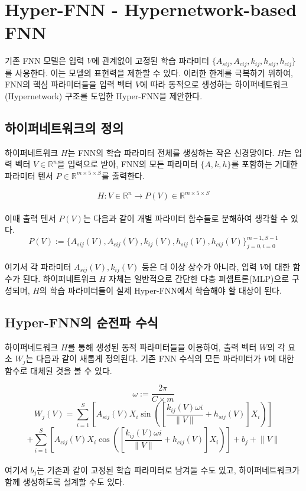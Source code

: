 \documentclass{book}
\begin{document}
\chapter{Hyper-FNN - Hypernetwork-based FNN}

기존 FNN 모델은 입력 $V$에 관계없이 고정된 학습 파라미터 $\{A_{sij}, A_{cij}, k_{ij}, h_{sij}, h_{cij}\}$를 사용한다. 이는 모델의 표현력을 제한할 수 있다. 이러한 한계를 극복하기 위하여, FNN의 핵심 파라미터들을 입력 벡터 $V$에 따라 동적으로 생성하는 하이퍼네트워크(Hypernetwork) 구조를 도입한 Hyper-FNN을 제안한다.

\section{하이퍼네트워크의 정의}

하이퍼네트워크 $H$는 FNN의 학습 파라미터 전체를 생성하는 작은 신경망이다. $H$는 입력 벡터 $V \in \mathbb{R}^n$을 입력으로 받아, FNN의 모든 파라미터 $\{A, k, h\}$를 포함하는 거대한 파라미터 텐서 $P \in \mathbb{R}^{m \times 5 \times S}$를 출력한다.

\[
H: V \in \mathbb{R}^n \rightarrow P(V) \in \mathbb{R}^{m \times 5 \times S}
\]
\\
이때 출력 텐서 $P(V)$는 다음과 같이 개별 파라미터 함수들로 분해하여 생각할 수 있다.
\[
P(V) := \{A_{sij}(V), A_{cij}(V), k_{ij}(V), h_{sij}(V), h_{cij}(V)\}_{j=0, i=0}^{m-1, S-1}
\]
\\
여기서 각 파라미터 $A_{sij}(V), k_{ij}(V)$ 등은 더 이상 상수가 아니라, 입력 $V$에 대한 함수가 된다. 하이퍼네트워크 $H$ 자체는 일반적으로 간단한 다층 퍼셉트론(MLP)으로 구성되며, $H$의 학습 파라미터들이 실제 Hyper-FNN에서 학습해야 할 대상이 된다.

\section{Hyper-FNN의 순전파 수식}

하이퍼네트워크 $H$를 통해 생성된 동적 파라미터들을 이용하여, 출력 벡터 $W$의 각 요소 $W_j$는 다음과 같이 새롭게 정의된다. 기존 FNN 수식의 모든 파라미터가 $V$에 대한 함수로 대체된 것을 볼 수 있다.

\[
\omega:=\frac{2 \pi}{C \times m}
\]
\[
W_j(V) = \sum_{i=1}^{S} \left [ A_{sij}(V) X_i \sin \left ( \left [ \frac{k_{ij}(V) \omega i}{\lVert V \rVert} + h_{sij}(V) \right ] X_i \right ) \right ]
\]
\[
+\sum_{i=1}^{S} \left [ A_{cij}(V) X_i \cos \left ( \left [ \frac{k_{ij}(V) \omega i}{\lVert V \rVert} + h_{cij}(V) \right ] X_i \right ) \right ] + b_j + \lVert V \rVert
\]
\\
여기서 $b_j$는 기존과 같이 고정된 학습 파라미터로 남겨둘 수도 있고, 하이퍼네트워크가 함께 생성하도록 설계할 수도 있다.
\end{document}
